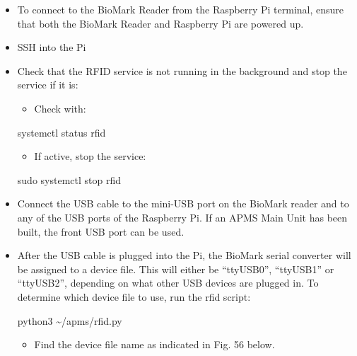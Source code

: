 \documentclass[
  letterpaper,
]{scrbook}
\newenvironment{Shaded}{\begin{snugshade}}{\end{snugshade}}
\newcommand{\ExtensionTok}[1]{\textcolor[rgb]{0.00,0.23,0.31}{#1}}
\newcommand{\FunctionTok}[1]{\textcolor[rgb]{0.28,0.35,0.67}{#1}}
\newcommand{\NormalTok}[1]{\textcolor[rgb]{0.00,0.23,0.31}{#1}}
\providecommand{\tightlist}{%
  \setlength{\itemsep}{0pt}\setlength{\parskip}{0pt}}
\begin{document}
\begin{itemize}
\item
  To connect to the BioMark Reader from the Raspberry Pi terminal,
  ensure that both the BioMark Reader and Raspberry Pi are powered up.
\item
  SSH into the Pi
\item
  Check that the RFID service is not running in the background and stop
  the service if it is:

  \begin{itemize}
  \tightlist
  \item
    Check with:
  \end{itemize}

\begin{Shaded}
\begin{Highlighting}[]
\ExtensionTok{systemctl}\NormalTok{ status rfid}
\end{Highlighting}
\end{Shaded}

  \begin{itemize}
  \tightlist
  \item
    If active, stop the service:
  \end{itemize}

\begin{Shaded}
\begin{Highlighting}[]
\FunctionTok{sudo}\NormalTok{ systemctl stop rfid}
\end{Highlighting}
\end{Shaded}
\item
  Connect the USB cable to the mini-USB port on the BioMark reader and
  to any of the USB ports of the Raspberry Pi. If an APMS Main Unit has
  been built, the front USB port can be used.
\item
  After the USB cable is plugged into the Pi, the BioMark serial
  converter will be assigned to a device file. This will either be
  ``ttyUSB0'', ``ttyUSB1'' or ``ttyUSB2'', depending on what other USB
  devices are plugged in. To determine which device file to use, run the
  rfid script:

\begin{Shaded}
\begin{Highlighting}[]
\ExtensionTok{python3}\NormalTok{ \textasciitilde{}/apms/rfid.py}
\end{Highlighting}
\end{Shaded}

  \begin{itemize}
  \tightlist
  \item
    Find the device file name as indicated in Fig. 56 below.
  \end{itemize}
\end{itemize}
\end{document}
